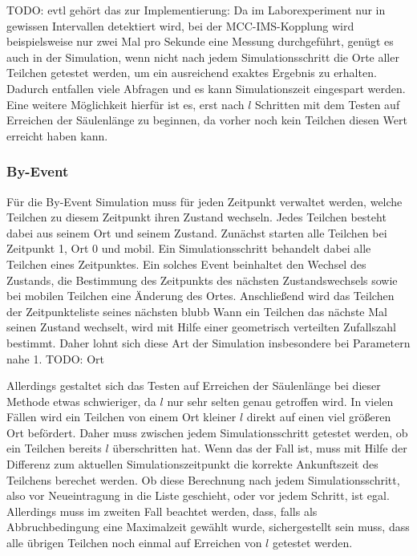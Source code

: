 TODO: evtl gehört das zur Implementierung: Da im Laborexperiment nur in gewissen Intervallen detektiert wird, bei der MCC-IMS-Kopplung wird beispielsweise nur zwei Mal pro Sekunde eine Messung durchgeführt, genügt es auch in der Simulation, wenn nicht nach jedem Simulationsschritt die Orte aller Teilchen getestet werden, um ein ausreichend exaktes Ergebnis zu erhalten.
Dadurch entfallen viele Abfragen und es kann Simulationszeit eingespart werden. Eine weitere Möglichkeit hierfür ist es, erst nach $l$ Schritten mit dem Testen auf Erreichen der Säulenlänge zu beginnen, da vorher noch kein Teilchen diesen Wert erreicht haben kann.

\subsubsection{By-Event}

Für die By-Event Simulation muss für jeden Zeitpunkt verwaltet werden, welche Teilchen zu diesem Zeitpunkt ihren Zustand wechseln. Jedes Teilchen besteht dabei aus seinem Ort und seinem Zustand. 
Zunächst starten alle Teilchen bei Zeitpunkt 1, Ort 0 und mobil.
Ein Simulationsschritt behandelt dabei alle Teilchen eines Zeitpunktes. Ein solches Event beinhaltet den Wechsel des Zustands, die Bestimmung des Zeitpunkts des nächsten Zustandswechsels sowie bei mobilen Teilchen eine Änderung des Ortes. Anschließend wird das Teilchen der Zeitpunkteliste seines nächsten blubb
Wann ein Teilchen das nächste Mal seinen Zustand wechselt, wird mit Hilfe einer geometrisch verteilten Zufallszahl bestimmt. Daher lohnt sich diese Art der Simulation insbesondere bei Parametern nahe 1. 
TODO: Ort

Allerdings gestaltet sich das Testen auf Erreichen der Säulenlänge bei dieser Methode etwas schwieriger, da $l$ nur sehr selten genau getroffen wird. In vielen Fällen wird ein Teilchen von einem Ort kleiner $l$ direkt auf einen viel größeren Ort befördert. Daher muss zwischen jedem Simulationsschritt getestet werden, ob ein Teilchen bereits $l$ überschritten hat. Wenn das der Fall ist, muss mit Hilfe der Differenz zum aktuellen Simulationszeitpunkt die korrekte Ankunftszeit des Teilchens berechet werden.
Ob diese Berechnung nach jedem Simulationsschritt, also vor Neueintragung in die Liste geschieht, oder vor jedem Schritt, ist egal. Allerdings muss im zweiten Fall beachtet werden, dass, falls als Abbruchbedingung eine Maximalzeit gewählt wurde, sichergestellt sein muss, dass alle übrigen Teilchen noch einmal auf Erreichen von $l$ getestet werden.


